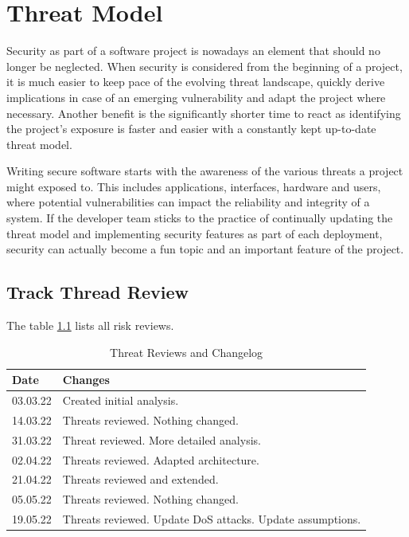 \chapter{Threat Model}

Security as part of a software project is nowadays an element that should no longer be neglected. When security is considered from the beginning of a project, it is much easier to keep pace of the evolving threat landscape, quickly derive implications in case of an emerging vulnerability and adapt the project where necessary. Another benefit is the significantly shorter time to react as identifying the project's exposure is faster and easier with a constantly kept up-to-date threat model.

Writing secure software starts with the awareness of the various threats a project might exposed to. This includes applications, interfaces, hardware and users, where potential vulnerabilities can impact the reliability and integrity of a system. If the developer team sticks to the practice of continually updating the threat model and implementing security features as part of each deployment, security can actually become a fun topic and an important feature of the project.

\section{Track Thread Review}
The table \ref{tab:threat-review} lists all risk reviews.

\begin{table}[h!]
  \centering
  \caption{\label{tab:threat-review}Threat Reviews and Changelog}
  \begin{tabular}{ | l | l | }
    \hline
    \textbf{Date} & \textbf{Changes} \\
    \hline
    03.03.22 & Created initial analysis. \\
    \hline
    14.03.22 & Threats reviewed. Nothing changed. \\
    \hline
    31.03.22 & Threat reviewed. More detailed analysis. \\
    \hline
    02.04.22 & Threats reviewed. Adapted architecture.\\
    \hline
    21.04.22 & Threats reviewed and extended.\\
    \hline
    05.05.22 & Threats reviewed. Nothing changed. \\
    \hline
    19.05.22 & Threats reviewed. Update DoS attacks. Update assumptions. \\
    \hline
  \end{tabular}
\end{table}

